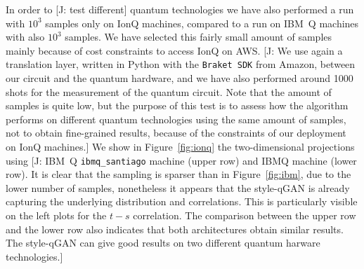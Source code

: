 \documentclass[twocolumn,preprintnumbers,superscriptaddress]{revtex4-2}
\newcommand{\commentJB}[1]{{\color{blue} {[J: #1]}}}
\begin{document}
In order to \commentJB{test different} quantum technologies we have also performed a run
with $10^3$ samples only on IonQ machines, compared to a run on IBM~Q
machines with also $10^3$ samples. We have selected this fairly small
amount of samples mainly because of cost constraints to access IonQ on
AWS.
\commentJB{We use again a translation layer, written in Python with the
\texttt{Braket SDK} from Amazon, between our circuit and the quantum hardware, and we
have also performed around 1000 shots for the measurement of the quantum circuit.
Note that the amount of samples is quite low, but the purpose of this test is to assess
how the algorithm performs on different quantum technologies using the same amount of
samples, not to obtain fine-grained results, because of the constraints of our deployment
on IonQ machines.} We show in Figure~\ref{fig:ionq} the two-dimensional projections using
\commentJB{IBM~Q  {\tt ibmq\_santiago} machine (upper row) and IBMQ machine (lower row).
It is clear that the sampling is sparser than in Figure~\ref{fig:ibm}, due to the lower number of
samples, nonetheless it appears that the style-qGAN is already capturing the underlying
distribution and correlations. This is particularly visible on the left plots for the $t-s$ correlation.
The comparison between the upper row and the lower row also indicates that both architectures
obtain similar results. The style-qGAN can give good results on two different quantum harware
technologies.}
\end{document}
